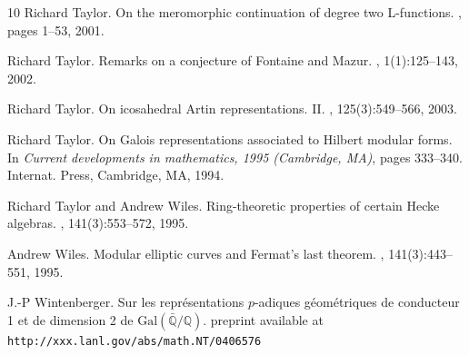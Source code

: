 \documentclass[12pt]{amsart}
\newcommand{\Galois}{\mathrm{Gal}}
\newcommand{\Gal}{\Galois( \bar{ {\mathbb Q}}/{\mathbb Q})}
\begin{document}
\begin{thebibliography}{10}
Richard Taylor.
\newblock On the meromorphic continuation of degree two {L}-functions.
, pages 1--53, 2001.

Richard Taylor.
\newblock Remarks on a conjecture of {F}ontaine and {M}azur.
, 1(1):125--143, 2002.

Richard Taylor.
\newblock On icosahedral {A}rtin representations. {II}.
, 125(3):549--566, 2003.

Richard Taylor.
\newblock On {G}alois representations associated to {H}ilbert modular forms.
\newblock In {\em Current developments in mathematics, 1995 (Cambridge, MA)},
  pages 333--340. Internat. Press, Cambridge, MA, 1994.

Richard Taylor and Andrew Wiles.
\newblock Ring-theoretic properties of certain {H}ecke algebras.
, 141(3):553--572, 1995.

Andrew Wiles.
\newblock Modular elliptic curves and {F}ermat's last theorem.
, 141(3):443--551, 1995.

J.-P Wintenberger.
\newblock Sur les repr\'esentations $p$-adiques g\'eom\'etriques de conducteur
  1 et de dimension 2 de $\Gal$.
\newblock preprint available at {\tt http://xxx.lanl.gov/abs/math.NT/0406576}

\end{thebibliography}
\end{document}
